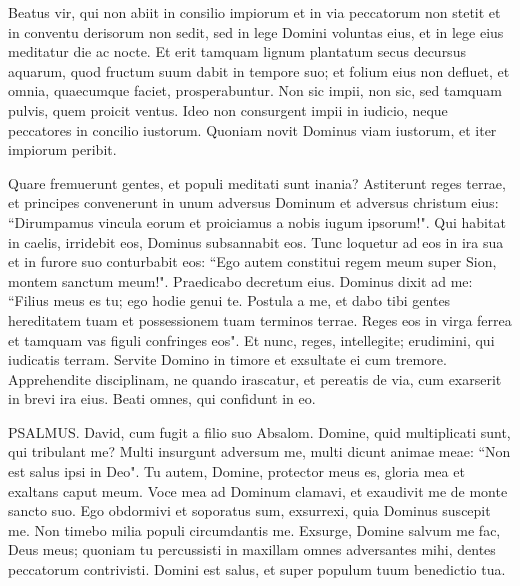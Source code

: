 
\begin{biblechapter}  
\verse Beatus vir, qui non abiit in consilio impiorum et in via peccatorum non stetit et in conventu derisorum non sedit, 
\verse sed in lege Domini voluntas eius, et in lege eius meditatur die ac nocte. 
\verse Et erit tamquam lignum plantatum secus decursus aquarum, quod fructum suum dabit in tempore suo; et folium eius non defluet, et omnia, quaecumque faciet, prosperabuntur. 
\verse Non sic impii, non sic, sed tamquam pulvis, quem proicit ventus. 
\verse Ideo non consurgent impii in iudicio, neque peccatores in concilio iustorum. 
\verse Quoniam novit Dominus viam iustorum, et iter impiorum peribit. 
\end{biblechapter}

\begin{biblechapter}  
\verse Quare fremuerunt gentes, et populi meditati sunt inania? 
\verse Astiterunt reges terrae, et principes convenerunt in unum adversus Dominum et adversus christum eius: 
\verse “Dirumpamus vincula eorum et proiciamus a nobis iugum ipsorum!". 
\verse Qui habitat in caelis, irridebit eos, Dominus subsannabit eos. 
\verse Tunc loquetur ad eos in ira sua et in furore suo conturbabit eos: 
\verse “Ego autem constitui regem meum super Sion, montem sanctum meum!". 
\verse Praedicabo decretum eius. Dominus dixit ad me: “Filius meus es tu; ego hodie genui te. 
\verse Postula a me, et dabo tibi gentes hereditatem tuam et possessionem tuam terminos terrae. 
\verse Reges eos in virga ferrea et tamquam vas figuli confringes eos". 
\verse Et nunc, reges, intellegite; erudimini, qui iudicatis terram. 
\verse Servite Domino in timore et exsultate ei cum tremore. 
\verse Apprehendite disciplinam, ne quando irascatur, et pereatis de via, cum exarserit in brevi ira eius. Beati omnes, qui confidunt in eo. 
\end{biblechapter}

\begin{biblechapter}  
\verse  PSALMUS. David, cum fugit a filio suo Absalom. 
\verse Domine, quid multiplicati sunt, qui tribulant me? Multi insurgunt adversum me, 
\verse multi dicunt animae meae: “Non est salus ipsi in Deo". 
\verse Tu autem, Domine, protector meus es, gloria mea et exaltans caput meum. 
\verse Voce mea ad Dominum clamavi, et exaudivit me de monte sancto suo. 
\verse Ego obdormivi et soporatus sum, exsurrexi, quia Dominus suscepit me. 
\verse Non timebo milia populi circumdantis me. Exsurge, Domine salvum me fac, Deus meus; 
\verse quoniam tu percussisti in maxillam omnes adversantes mihi, dentes peccatorum contrivisti. 
\verse Domini est salus, et super populum tuum benedictio tua. 
\end{biblechapter}

